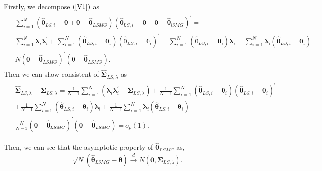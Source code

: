 \documentclass[12pt,a4paper,hyperref]{article}
\begin{document}
Firstly, we decompose $(\ref{V1})$ as
\begin{align}
\begin{split}
&\sum^{N}_{i=1}\left( \hat{\boldsymbol{\theta}}_{LS,i}- \boldsymbol{\theta}+\boldsymbol{\theta}-    \hat{\boldsymbol{\theta}}_{LSMG}\right)\left( \hat{\boldsymbol{\theta}}_{LS,i}- \boldsymbol{\theta}+\boldsymbol{\theta}-    \hat{\boldsymbol{\theta}}_{lSMG}\right)^{'}= \\
& \sum^{N}_{i=1} \boldsymbol{\lambda}_{i}\boldsymbol{\lambda}^{'}_{i}+\sum^{N}_{i=1}\left(\hat{\boldsymbol{\theta}}_{LS,i}-\boldsymbol{\theta}_{i} \right)\left(\hat{\boldsymbol{\theta}}_{LS,i}-\boldsymbol{\theta}_{i} \right)^{'}+\sum^{N}_{i=1}\left(\hat{\boldsymbol{\theta}}_{LS,i}-\boldsymbol{\theta}_{i}  \right) \boldsymbol{\lambda}_{i}+\sum^{N}_{i=1}\boldsymbol{\lambda}_{i} \left(\hat{\boldsymbol{\theta}}_{LS,i}-\boldsymbol{\theta}_{i}  \right) -\\
&N\left(\boldsymbol{\theta}-\hat{\boldsymbol{\theta}}_{LSMG} \right)^{'}\left(\boldsymbol{\theta}-\hat{\boldsymbol{\theta}}_{LSMG} \right). \label{V2}
\end{split}
\end{align}
Then we can show consistent of $\hat{\boldsymbol{\Sigma}}_{LS,\lambda}$ as
\begin{align}
\begin{split}
&\hat{\boldsymbol{\Sigma}}_{LS,\lambda}-\boldsymbol{\Sigma}_{LS,\lambda}=
 \frac{1}{N-1}\sum^{N}_{i=1}\left( \boldsymbol{\lambda}_{i}\boldsymbol{\lambda}^{'}_{i}-\boldsymbol{\Sigma}_{LS,\lambda}\right) +\frac{1}{N-1}\sum^{N}_{i=1}\left(\hat{\boldsymbol{\theta}}_{LS,i}-\boldsymbol{\theta}_{i} \right)\left(\hat{\boldsymbol{\theta}}_{LS,i}-\boldsymbol{\theta}_{i} \right)^{'} \\
&+\frac{1}{N-1}\sum^{N}_{i=1}\left(\hat{\boldsymbol{\theta}}_{LS,i}-\boldsymbol{\theta}_{i}  \right) \boldsymbol{\lambda}_{i}+\frac{1}{N-1}\sum^{N}_{i=1}\boldsymbol{\lambda}_{i} \left(\hat{\boldsymbol{\theta}}_{LS,i}-\boldsymbol{\theta}_{i}  \right) -\\
&\frac{N}{N-1}\left(\boldsymbol{\theta}-\hat{\boldsymbol{\theta}}_{LSMG} \right)^{'}\left(\boldsymbol{\theta}-\hat{\boldsymbol{\theta}}_{LSMG} \right)  =o_{p}(1).
\end{split}
\end{align}

Then, we can see that the asymptotic property of $\hat{\boldsymbol{\theta}}_{LSMG} $ as,
\begin{align}
\sqrt{N}\left(\hat{\boldsymbol{\theta}}_{LSMG}-\boldsymbol{\theta}  \right)\overset{d}{\to} N\left(\boldsymbol{0},\boldsymbol{\Sigma}_{LS,\lambda} \right).
\end{align}
\end{document}
